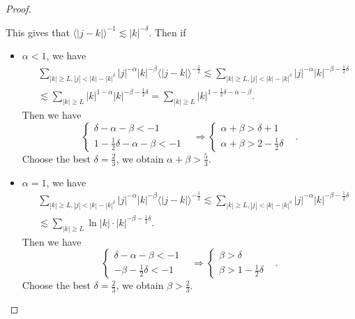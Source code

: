 \documentclass[12pt]{amsart}
\theoremstyle{definition}
\numberwithin{equation}{section}
\begin{document}
\begin{proof}
\begin{enumerate}
$$     $$
     This gives that $\langle |j-k| \rangle^{-1}\lesssim|k|^{-\delta}$. Then if  
     \begin{itemize}
        \item  $\alpha<1$, we have 
     \begin{align*}
        & \sum_{|k|\ge L,|j|<|k|-|k|^\delta}|j|^{-\alpha}|k|^{-\beta}\langle |j-k|\rangle^{-\frac{1}{2}}\lesssim \sum_{|k|\ge L,|j|<|k|-|k|^{\delta}}|j|^{-\alpha}|k|^{-\beta-\frac{1}{2}\delta}\\
        &\lesssim \sum_{|k|\ge L }|k|^{1-\alpha}|k|^{-\beta-\frac{1}{2}\delta}=\sum_{|k|\ge L}|k|^{1-\frac{1}{2}\delta-\alpha-\beta}.
     \end{align*}
  Then we have
  $$
     \begin{cases}
        \delta-\alpha-\beta<-1 &\\
        1-\frac{1}{2}\delta-\alpha-\beta<-1&
     \end{cases}\Rightarrow \begin{cases}
        \alpha+\beta>\delta+1 &\\
        \alpha+\beta>2-\frac{1}{2}\delta&
     \end{cases}.
  $$
 Choose the best $\delta=\frac{2}{3}$, we obtain $\alpha+\beta>\frac{5}{3}$. 
     \item $\alpha=1$, we have 
     \begin{align*}
           & \sum_{|k|\ge L,|j|<|k|-|k|^\delta}|j|^{-\alpha}|k|^{-\beta}\langle |j-k|\rangle^{-\frac{1}{2}}\lesssim \sum_{|k|\ge L,|j|<|k|-|k|^{\delta}}|j|^{-\alpha}|k|^{-\beta-\frac{1}{2}\delta}\\
           &\lesssim \sum_{|k|\ge L }\ln|k|\cdot|k|^{-\beta-\frac{1}{2}\delta}.
     \end{align*} 
     Then we have
     $$
        \begin{cases}
           \delta-\alpha-\beta<-1 &\\
           -\beta-\frac{1}{2}\delta<-1
        \end{cases}\Rightarrow \begin{cases}
           \beta>\delta &\\
           \beta >1-\frac{1}{2}\delta
        \end{cases}.
     $$
     Choose the best $\delta=\frac{2}{3}$, we obtain $\beta>\frac{2}{3}$.  
     

\end{itemize}
\end{enumerate}
\end{proof}
\end{document}
